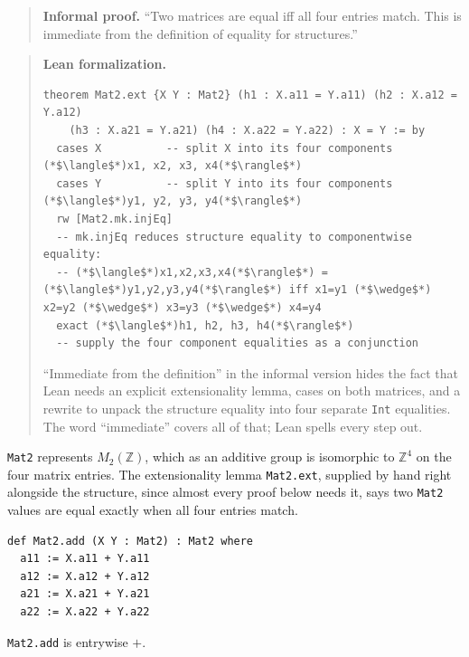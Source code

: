 \begin{quote}
\textbf{Informal proof.} ``Two matrices are equal iff all four entries match. This is immediate from the definition of equality for structures.''
\end{quote}

\begin{quote}
\textbf{Lean formalization.}

\begin{lstlisting}
theorem Mat2.ext {X Y : Mat2} (h1 : X.a11 = Y.a11) (h2 : X.a12 = Y.a12)
    (h3 : X.a21 = Y.a21) (h4 : X.a22 = Y.a22) : X = Y := by
  cases X          -- split X into its four components (*$\langle$*)x1, x2, x3, x4(*$\rangle$*)
  cases Y          -- split Y into its four components (*$\langle$*)y1, y2, y3, y4(*$\rangle$*)
  rw [Mat2.mk.injEq]
  -- mk.injEq reduces structure equality to componentwise equality:
  -- (*$\langle$*)x1,x2,x3,x4(*$\rangle$*) = (*$\langle$*)y1,y2,y3,y4(*$\rangle$*) iff x1=y1 (*$\wedge$*) x2=y2 (*$\wedge$*) x3=y3 (*$\wedge$*) x4=y4
  exact (*$\langle$*)h1, h2, h3, h4(*$\rangle$*)
  -- supply the four component equalities as a conjunction
\end{lstlisting}

``Immediate from the definition'' in the informal version hides the fact that Lean needs an explicit extensionality lemma, cases on both matrices, and a rewrite to unpack the structure equality into four separate \texttt{Int} equalities. The word ``immediate'' covers all of that; Lean spells every step out.
\end{quote}

\begin{mathreading}

\texttt{Mat2} represents \(M_2(\mathbb{Z})\), which as an additive group is isomorphic to \(\mathbb{Z}^4\) on the four matrix entries. The extensionality lemma \texttt{Mat2.ext}, supplied by hand right alongside the structure, since almost every proof below needs it, says two \texttt{Mat2} values are equal exactly when all four entries match.

\end{mathreading}

\begin{lstlisting}
def Mat2.add (X Y : Mat2) : Mat2 where
  a11 := X.a11 + Y.a11
  a12 := X.a12 + Y.a12
  a21 := X.a21 + Y.a21
  a22 := X.a22 + Y.a22
\end{lstlisting}

\texttt{Mat2.add} is entrywise \(+\).

